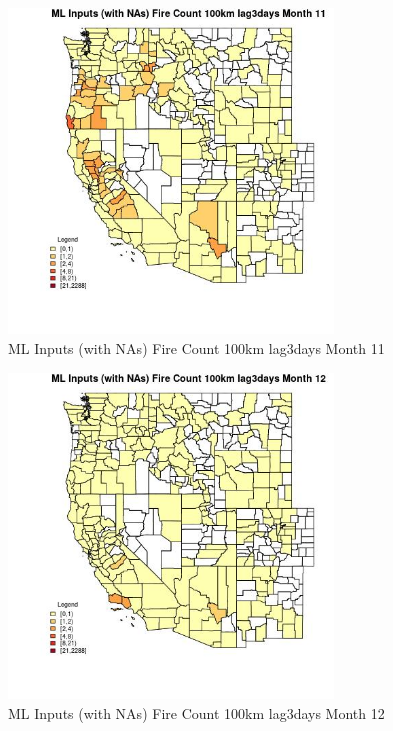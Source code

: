 \begin{figure} 
\centering  
\includegraphics[width=0.77\textwidth]{Code_Outputs/Report_ML_input_PM25_Step4_part_e_de_duplicated_aves_compiled_2019-05-21wNAs_CountyFire_Count_100km_lag3daysmedianMonth11.jpg} 
\caption{\label{fig:Report_ML_input_PM25_Step4_part_e_de_duplicated_aves_compiled_2019-05-21wNAsCountyFire_Count_100km_lag3daysmedianMonth11}ML Inputs (with NAs) Fire Count 100km lag3days Month 11} 
\end{figure} 
 

\begin{figure} 
\centering  
\includegraphics[width=0.77\textwidth]{Code_Outputs/Report_ML_input_PM25_Step4_part_e_de_duplicated_aves_compiled_2019-05-21wNAs_CountyFire_Count_100km_lag3daysmedianMonth12.jpg} 
\caption{\label{fig:Report_ML_input_PM25_Step4_part_e_de_duplicated_aves_compiled_2019-05-21wNAsCountyFire_Count_100km_lag3daysmedianMonth12}ML Inputs (with NAs) Fire Count 100km lag3days Month 12} 
\end{figure} 
 

